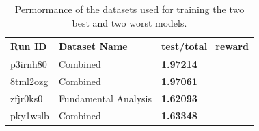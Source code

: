 \documentclass[../xlapes02]{subfiles}
\begin{document}
    \begin{table}[!ht]
        \centering
        \label{tab:best-worst-datasets}
        \begin{tabular}{|l|l|l|}
            \hline
            \textbf{Run ID} & \textbf{Dataset Name} & \textbf{test/total\_reward}                  \\ \hline
            p3irnh80        & Combined              & \textcolor[RGB]{50,150,50}{\textbf{1.97214}} \\ \hline
            8tml2ozg        & Combined              & \textcolor[RGB]{50,150,50}{\textbf{1.97061}} \\ \hline
            zfjr0ks0        & Fundamental Analysis  & \textcolor[RGB]{150,50,50}{\textbf{1.62093}} \\ \hline
            pky1wslb        & Combined              & \textcolor[RGB]{150,50,50}{\textbf{1.63348}} \\ \hline
        \end{tabular}
        \caption{Permormance of the datasets used for training the two best and two worst models.}
    \end{table}
\end{document}
